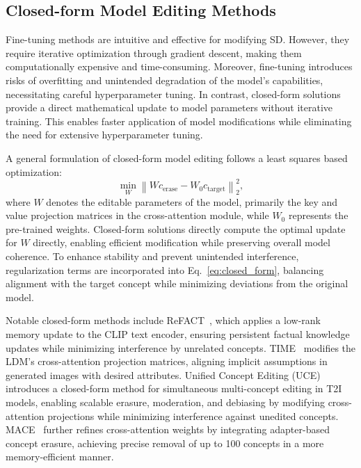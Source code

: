 \subsection{Closed-form Model Editing Methods} \label{subsec:closed}
Fine-tuning methods are intuitive and effective for modifying SD. However, they require iterative optimization through gradient descent, making them computationally expensive and time-consuming. Moreover, fine-tuning introduces risks of overfitting and unintended degradation of the model’s capabilities, necessitating careful hyperparameter tuning. In contrast, closed-form solutions provide a direct mathematical update to model parameters without iterative training. This enables faster application of model modifications while eliminating the need for extensive hyperparameter tuning. 

A general formulation of closed-form model editing follows a least squares based optimization:
\begin{equation} \label{eq:closed_form}
\min_{W} \left\| W c_{\text{erase}} - W_0 c_{\text{target}} \right\|_2^2,
\end{equation}
where \( W \) denotes the editable parameters of the model, primarily the key and value projection matrices in the cross-attention module, while \( W_0 \) represents the pre-trained weights. Closed-form solutions directly compute the optimal update for \( W \) directly, enabling efficient modification while preserving overall model coherence. To enhance stability and prevent unintended interference, regularization terms are incorporated into Eq.~\eqref{eq:closed_form}, balancing alignment with the target concept while minimizing deviations from the original model.

Notable closed-form methods include ReFACT~\cite{Arad2023ReFACTUT}, which applies a low-rank memory update to the CLIP text encoder, ensuring persistent factual knowledge updates while minimizing interference by unrelated concepts. TIME~\cite{Orgad2023EditingIA} modifies the LDM’s cross-attention projection matrices, aligning implicit assumptions in generated images with desired attributes. Unified Concept Editing (UCE)~\cite{Gandikota2023UnifiedCE} introduces a closed-form method for simultaneous multi-concept editing in T2I models, enabling scalable erasure, moderation, and debiasing by modifying cross-attention projections while minimizing interference against unedited concepts. MACE~\cite{Lu2024MACEMC} further refines cross-attention weights by integrating adapter-based concept erasure, achieving precise removal of up to 100 concepts in a more memory-efficient manner.

